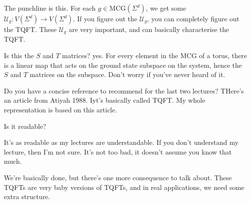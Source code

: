 The punchline is this.
For each $g\in \mathrm{MCG}(\Sigma^d)$,
we get some $\mathcal{U}_g: V(\Sigma^d) \to V(\Sigma^d)$.
If you figure out the $\mathcal{U}_g$,
you can completely figure out the TQFT.
These $\mathcal{U}_g$ are very important,
and can basically characterise the TQFT.

Is this the $S$ and $T$ matrices?
yes.
For every element in the MCG  of a torus,
there is a linear map that acts on the ground state subspace on the system,
hence the $S$ and $T$ matrices on the subspace.
Don't worry if you've never heard of it.

Do you have a concise reference to recommend for the last two lectures?
THere's an article from Atiyah 1988.
Iyt's basically called TQFT.
My whole representation is based on this article.

\begin{question}
    Is it readable?
\end{question}
It's as readable as my lectures are understandable.
If you don't understand my lecture,
then I'm not sure.
It's not too bad,
it doesn't assume you know that much.

We're basically done,
but there's one more consequence to talk about.
These TQFTs are very baby versions of TQFTs,
and in real applications, we need some extra structure.

